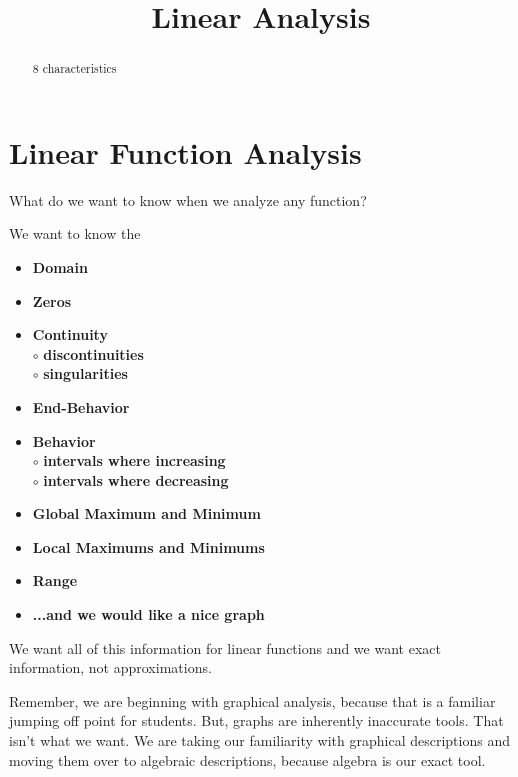 \documentclass{ximera}
\title{Linear Analysis}
\begin{document}
\begin{abstract}
8 characteristics
\end{abstract}
\maketitle





\section*{Linear Function Analysis}

What do we want to know when we analyze any function?

We want to know the 
\begin{itemize}
     \item \textbf{\textcolor{red!70!black}{Domain}} 
     \item \textbf{\textcolor{red!70!black}{Zeros}} 
     \item \textbf{\textcolor{red!70!black}{Continuity}} \\
     \text{    }$\circ$ \textbf{\textcolor{purple!85!blue}{discontinuities}}\\
     \text{    }$\circ$ \textbf{\textcolor{purple!85!blue}{singularities}}\\
     \item \textbf{\textcolor{red!70!black}{End-Behavior}} 
     \item \textbf{\textcolor{red!70!black}{Behavior}} \\
     \text{    }$\circ$ \textbf{\textcolor{purple!85!blue}{intervals where increasing}}\\
     \text{    }$\circ$ \textbf{\textcolor{purple!85!blue}{intervals where decreasing}}\\
     \item \textbf{\textcolor{red!70!black}{Global Maximum and Minimum}} 
     \item \textbf{\textcolor{red!70!black}{Local Maximums and Minimums}} 
     \item \textbf{\textcolor{red!70!black}{Range}} 
     \item \textbf{\textcolor{blue!55!black}{...and we would like a nice graph}} 
\end{itemize}

We want all of this information for linear functions and we want exact information, not approximations. 

Remember, we are beginning with graphical analysis, because that is a familiar jumping off point for students.  But, graphs are inherently inaccurate tools.  That isn't what we want. We are taking our familiarity with graphical descriptions and moving them over to algebraic descriptions, because algebra is our exact tool. 
\end{document}
